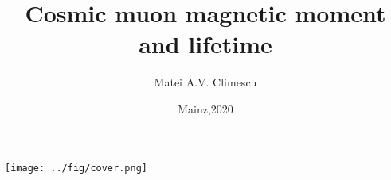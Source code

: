 \documentclass[12pt]{report}
\title{Cosmic muon magnetic moment and lifetime}
\author{Matei A.V. Climescu}
\date{Mainz,2020}
\newenvironment{changemargin}[2]{%
\begin{list}{}{%
\setlength{\topsep}{0pt}%
\setlength{\leftmargin}{#1}%
\setlength{\rightmargin}{#2}%
\setlength{\listparindent}{\parindent}%
\setlength{\itemindent}{\parindent}%
\setlength{\parsep}{\parskip}%
}%
\item[]}{\end{list}}
\begin{document}
\begin{titlepage}
\begin{changemargin}{-0cm}{-0cm}
\texttt{[image: ../fig/cover.png]}
\end{changemargin}
\end{titlepage}
\end{document}
